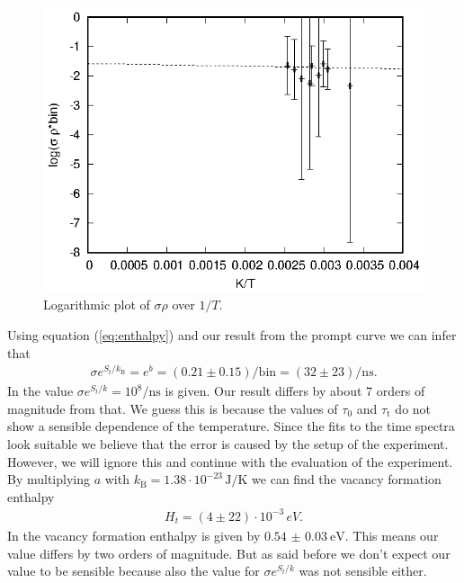 \begin{figure}[h]
\centering
\includegraphics[width=0.6\linewidth]{auswertung/fit.eps}
\caption{Logarithmic plot of $\sigma \rho$ over $1/T$.}
\label{fig:indium_res}
\end{figure}

Using equation (\ref{eq:enthalpy}) and our result from the prompt curve we can infer that 
\begin{align*}
  \sigma e^{S_t/k_\mathrm{B}} = e^b = (0.21 \pm 0.15)/\mathrm{bin} = (32 \pm 23) /\si{\nano\second}.
\end{align*}
In \cite{weiler} the value $\sigma e^{S_t/k} = 10^8/\si{\nano\second}$ is given. Our result differs by about 7 orders of magnitude from that. We guess this is because the values of $\tau_0$ and $\tau_\mathrm{t}$ do not show a sensible dependence of the temperature. Since the fits to the time spectra look suitable we believe that the error is caused by the setup of the experiment. However, we will ignore this and continue with the evaluation of the experiment. \\

By multiplying $a$ with $k_\mathrm{B} = 1.38 \cdot 10^{-23}\,\si{\joule/\kelvin}$ \cite{pdg} we can find the vacancy formation enthalpy
\begin{align*}
  H_t =(4 \pm 22) \cdot 10^{-3}\,\si{eV}.
\end{align*}
In \cite{weiler} the vacancy formation enthalpy is given by $\SI[separate-uncertainty=true]{0.54(3)}{\electronvolt}$. This means our value differs by two orders of magnitude. But as said before we don't expect our value to be sensible because also the value for $\sigma e^{S_t/k}$ was not sensible either. 
